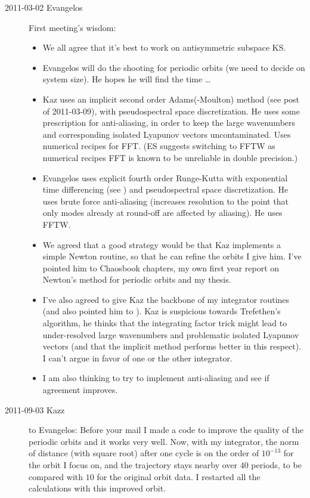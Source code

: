 \begin{description}
\item[2011-03-02 Evangelos] First meeting's wisdom:
\begin{itemize}
 \item We all agree that it's best to work on antisymmetric subspace KS.
 \item Evangelos will do the shooting for periodic orbits 
	(we need to decide on system size). He hopes he will find the time \ldots  
 \item Kaz uses an implicit second order Adams(-Moulton) method (see post of
	2011-03-09), with pseudospectral space discretization. 
	He uses some prescription for anti-aliasing, in order to keep the large wavenumbers
	and corresponding isolated Lyapunov vectors uncontaminated. Uses numerical 
	recipes for FFT. (ES suggests switching to FFTW as numerical recipes FFT is
	known to be unreliable in double precision.) 
 \item Evangelos uses explicit fourth order Runge-Kutta with exponential
	time differencing (see ) and pseudospectral space
	discretization. He uses brute force anti-aliasing (increases resolution
	to the point that only modes already at round-off are affected by
	aliasing). He uses FFTW. 
 \item We agreed that a good strategy would be that Kaz implements a simple
	Newton routine, so that he can refine the orbits I give him. I've 
	pointed him to Chaosbook chapters, my own first year report on Newton's
	method for periodic orbits and my thesis.
 \item I've also agreed to give Kaz the backbone of my integrator routines
	(and also pointed him to ). Kaz is suspicious towards
	Trefethen's algorithm, he thinks that the integrating factor trick might
	lead to under-resolved large wavenumbers and problematic isolated 
	Lyapunov vectors (and that the implicit method performs better in this
	respect). I can't argue in favor of one or the other integrator.
 \item I am also thinking to try to implement anti-aliasing and see
	if agreement improves.
\end{itemize}

\item[2011-09-03 Kazz] to Evangelos: 
Before your mail I made a code to improve the quality of the periodic orbits 
and it works very well. Now, with my integrator, the norm of distance 
(with square root) after one cycle is on the order of $10^{-13}$ for the orbit 
I focus on, and the trajectory stays nearby over $40$ periods, to be compared 
with $10$ for the original orbit data. I restarted all the calculations 
with this improved orbit.


\end{description}
